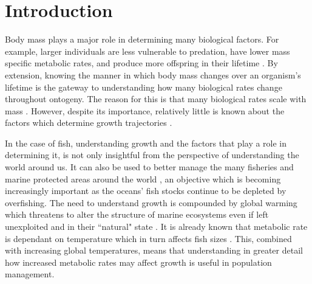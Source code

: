 \documentclass[a4paper, 11pt, hidelinks]{article} %
\begin{document}
	
	\tableofcontents
	\newpage
	\linenumbers
\section{Introduction}


	Body mass plays a major role in determining many biological factors.  For example, larger individuals are less vulnerable to predation, have lower mass specific metabolic rates, and produce more offspring in their lifetime \parencite{Peters1983, Barneche2018, Craig2006, Magnhagen2001, Hixon2014, Marshall2006}.
	By extension, knowing the manner in which body mass changes over an organism's lifetime is the gateway to understanding how many biological rates change throughout ontogeny.  The reason for this is that many biological rates scale with mass \parencite{Kleiber1932}.  However, despite its importance, relatively little is known about the factors which determine growth trajectories \parencite{Arendt2011, Marshall2019}.
	
	In the case of fish, understanding growth and the factors that play a role in determining it, is not only insightful from the perspective of understanding the world around us.  It can also be used to better manage the many fisheries and marine protected areas around the world \parencite{Heino2013, Lester2009}, an objective which is becoming increasingly important as the oceans' fish stocks continue to be depleted by overfishing. 
	The need to understand growth is compounded by global warming which threatens to alter the structure of marine ecosystems even if left unexploited and in their ``natural" state \parencite{Bruno2018}.
	It is already known that metabolic rate is dependant on temperature which in turn affects fish sizes \parencite{Gillooly2001, Brown2004}.  This, combined with increasing global temperatures, means that understanding in greater detail how increased metabolic rates %
	may affect growth is useful in population management.
	
\end{document}
